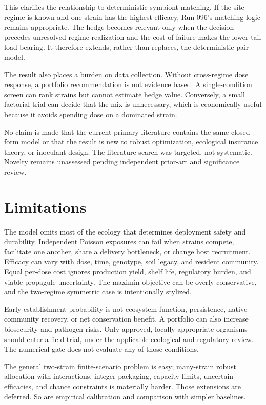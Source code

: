 \documentclass[10pt,twocolumn]{article}
\begin{document}
This clarifies the relationship to deterministic symbiont matching. If the
site regime is known and one strain has the highest efficacy, Run 096's
matching logic remains appropriate. The hedge becomes relevant only when the
decision precedes unresolved regime realization and the cost of failure makes
the lower tail load-bearing. It therefore extends, rather than replaces, the
deterministic pair model.

The result also places a burden on data collection. Without cross-regime dose
response, a portfolio recommendation is not evidence based. A single-condition
screen can rank strains but cannot estimate hedge value. Conversely, a small
factorial trial can decide that the mix is unnecessary, which is economically
useful because it avoids spending dose on a dominated strain.

No claim is made that the current primary literature contains the same
closed-form model or that the result is new to robust optimization, ecological
insurance theory, or inoculant design. The literature search was targeted, not
systematic. Novelty remains unassessed pending independent prior-art and
significance review.

\section{Limitations}

The model omits most of the ecology that determines deployment safety and
durability. Independent Poisson exposures can fail when strains compete,
facilitate one another, share a delivery bottleneck, or change host recruitment.
Efficacy can vary with dose, time, genotype, soil legacy, and resident community.
Equal per-dose cost ignores production yield, shelf life, regulatory burden,
and viable propagule uncertainty. The maximin objective can be overly
conservative, and the two-regime symmetric case is intentionally stylized.

Early establishment probability is not ecosystem function, persistence,
native-community recovery, or net conservation benefit. A portfolio can also
increase biosecurity and pathogen risks. Only approved, locally appropriate
organisms should enter a field trial, under the applicable ecological and
regulatory review. The numerical gate does not evaluate any of those conditions.

The general two-strain finite-scenario problem is easy; many-strain robust
allocation with interactions, integer packaging, capacity limits, uncertain
efficacies, and chance constraints is materially harder. Those extensions are
deferred. So are empirical calibration and comparison with simpler baselines.
\end{document}
